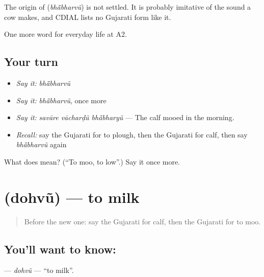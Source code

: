 \begin{cousinweb}
The origin of \textbf{} (\emph{bhā̃bharvũ}) is not settled. It is probably imitative of the sound a cow makes, and CDIAL lists no Gujarati form like it.
\end{cousinweb}

\begin{grammarlens}[title={What you've built}]
One more word for everyday life at A2.
\end{grammarlens}

\subsection*{Your turn}
\begin{itemize}
\raggedright
  \item \emph{Say it:} \emph{bhā̃bharvũ}
  \item \emph{Say it:} \emph{bhā̃bharvũ}, once more
  \item \emph{Say it:} \emph{savāre vācharḍũ bhā̃bharyũ} — The calf mooed in the morning.
  \item \emph{Recall:} say the Gujarati for to plough, then the Gujarati for calf, then say \emph{bhā̃bharvũ} again
\end{itemize}

\begin{tcolorbox}[breakable,colback=teal!4,colframe=teal!35!black,title={Before you move on}]
What does  mean? (\textquotedblleft{}To moo, to low\textquotedblright{}.) Say it once more.
\end{tcolorbox}
\section[\texorpdfstring{\gu{દોહવું} (dohvũ)}{દોહવું (dohvũ)}]{ (dohvũ) — to milk}

\label{lesson:GU-C234-dohvu}



\begin{quote}
Before the new one: say the Gujarati for calf, then the Gujarati for to moo.
\end{quote}

\subsection*{You'll want to know: }
\textbf{} — \emph{dohvũ} — \textquotedblleft{}to milk\textquotedblright{}.

